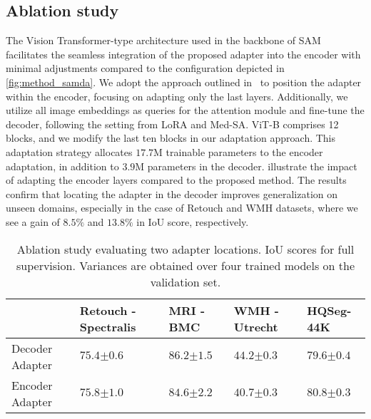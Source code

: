 \subsection{Ablation study}\label{sec:ablation_samda}
The Vision Transformer-type architecture used in the backbone of SAM facilitates the seamless integration of the proposed adapter into the encoder with minimal adjustments compared to the configuration depicted in \cref{fig:method_samda}. We adopt the approach outlined in~ to position the adapter within the encoder, focusing on adapting only the last layers. Additionally, we utilize all image embeddings as queries for the attention module and fine-tune the decoder, following the setting from LoRA and Med-SA. ViT-B comprises 12 blocks, and we modify the last ten blocks in our adaptation approach. This adaptation strategy allocates $17.7$M trainable parameters to the encoder adaptation, in addition to $3.9$M parameters in the decoder.  illustrate the impact of adapting the encoder layers compared to the proposed method. The results confirm that locating the adapter in the decoder improves generalization on unseen domains, especially in the case of Retouch and WMH datasets, where we see a gain of $8.5\%$ and $13.8\%$ in IoU score, respectively.

\begin{table*}[]
\caption{Ablation study evaluating two adapter locations. IoU scores for full supervision. Variances are obtained over four trained models on the validation set.}
\label{tab:encoder_ablation_trained}
\centering
\begin{tabular}{@{}lP{3.3cm}P{2.5cm}P{2.5cm}P{2.5cm}@{}}
\toprule
 & Retouch - Spectralis & MRI - BMC & WMH - Utrecht & HQSeg-44K  \\ \midrule
Decoder Adapter & $75.4{\scriptscriptstyle \pm 0.6}$ & $\mathbf{86.2}{\scriptscriptstyle \pm 1.5}$ & $\mathbf{44.2}{\scriptscriptstyle \pm 0.3}$ & $79.6{\scriptscriptstyle \pm 0.4}$ \\
Encoder Adapter & $\mathbf{75.8}{\scriptscriptstyle \pm 1.0}$ & $84.6{\scriptscriptstyle \pm 2.2}$ & $40.7{\scriptscriptstyle \pm 0.3}$ & $\mathbf{80.8}{\scriptscriptstyle \pm 0.3}$ \\ \bottomrule 
\end{tabular}
\end{table*}

